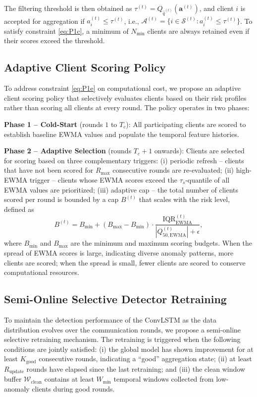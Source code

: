 The filtering threshold is then obtained as $\tau^{(t)} = Q_{\hat{q}^{(t)}}(\mathbf{a}^{(t)})$, and client $i$ is accepted for aggregation if $a_i^{(t)} \leq \tau^{(t)}$, i.e., $\mathcal{A}^{(t)} = \{i \in \mathcal{S}^{(t)} : a_i^{(t)} \leq \tau^{(t)}\}$. To satisfy constraint \eqref{eq:P1c}, a minimum of $N_{\min}$ clients are always retained even if their scores exceed the threshold.

\subsection{Adaptive Client Scoring Policy}\label{subsec:scoring_policy}

To address constraint \eqref{eq:P1e} on computational cost, we propose an adaptive client scoring policy that selectively evaluates clients based on their risk profiles rather than scoring all clients at every round. The policy operates in two phases:

\textbf{Phase 1 -- Cold-Start} (rounds $1$ to $T_c$): All participating clients are scored to establish baseline EWMA values and populate the temporal feature histories.

\textbf{Phase 2 -- Adaptive Selection} (rounds $T_c + 1$ onwards): Clients are selected for scoring based on three complementary triggers: (i) periodic refresh -- clients that have not been scored for $R_{\max}$ consecutive rounds are re-evaluated; (ii) high-EWMA trigger -- clients whose EWMA scores exceed the $\tau_s$-quantile of all EWMA values are prioritized; (iii) adaptive cap -- the total number of clients scored per round is bounded by a cap $B^{(t)}$ that scales with the risk level, defined as
\begin{equation}\label{eq:cap}
    B^{(t)} = B_{\min} + (B_{\max} - B_{\min}) \cdot \frac{\text{IQR}_{\text{EWMA}}^{(t)}}{|Q_{50,\text{EWMA}}^{(t)}| + \epsilon},
\end{equation}
where $B_{\min}$ and $B_{\max}$ are the minimum and maximum scoring budgets. When the spread of EWMA scores is large, indicating diverse anomaly patterns, more clients are scored; when the spread is small, fewer clients are scored to conserve computational resources.

\subsection{Semi-Online Selective Detector Retraining}\label{subsec:retraining}

To maintain the detection performance of the ConvLSTM as the data distribution evolves over the communication rounds, we propose a semi-online selective retraining mechanism. The retraining is triggered when the following conditions are jointly satisfied: (i) the global model has shown improvement for at least $K_{\text{good}}$ consecutive rounds, indicating a ``good'' aggregation state; (ii) at least $R_{\text{update}}$ rounds have elapsed since the last retraining; and (iii) the clean window buffer $\mathcal{W}_{\text{clean}}$ contains at least $W_{\min}$ temporal windows collected from low-anomaly clients during good rounds.

